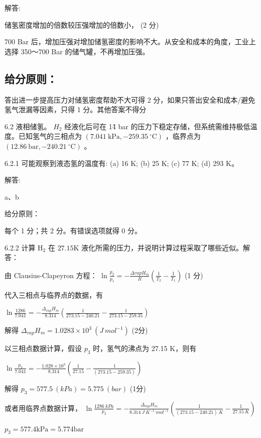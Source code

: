 解答:

储氢密度增加的倍数较压强增加的倍数小， (2 分)

700 Bar 后，增加压强对增加储氢密度的影响不大。从安全和成本的角度，工业上选择 350～700 Bar 的储气罐，不再增加压强。

\subsection*{给分原则：}

答出进一步提高压力对储氢密度帮助不大可得 2 分，如果只答出安全和成本/避免氢气泄漏等因素，只得 1 分。其他答案不得分

6.2 液相储氢。 $H_{2}$ 经液化后可在 1\~4 bar 的压力下稳定存储，但系统需维持极低温度。已知氢气的三相点为 $(7.041\ \text{kPa}, -259.35\ ^{\circ}\text{C})$ ，临界点为 $(12.86\ \text{bar}, -240.21\ ^{\circ}\text{C})$ 。

6.2.1 可能观察到液态氢的温度有: (a) 16 K; (b) 25 K; (c) 77 K; (d) 293 K。

解答:

a、b

给分原则：

每个 1 分；共 2 分。有错误选项就得 0 分。

6.2.2 计算 $\mathrm{H}_{2}$ 在 $27.15\mathrm{K}$ 液化所需的压力，并说明计算过程采取了哪些近似。解答：

由 Clausius-Clapeyron 方程： $\ln\frac{p_{2}}{p_{1}}=-\frac{\Delta vapH_{m}}{R}\left(\frac{1}{T_{2}}-\frac{1}{T_{1}}\right)$ (1 分)

代入三相点与临界点的数据，有

$
\ln {\frac {1 2 8 6}{7 . 0 4 1}} = - \frac {\Delta_ {v a p} H _ {m}}{8 . 3 1 4} \left(\frac {1}{2 7 3 . 1 5 - 2 4 0 . 2 1} - \frac {1}{2 7 3 . 1 5 - 2 5 9 . 3 5}\right)
$

解得 $\Delta_{vap}H_{m}=1.0283\times10^{3}\ (J\ mol^{-1})$ (2分)

以三相点数据计算，假设 $p_{3}$ 时，氢气的沸点为 27.15 K，则有

$
\ln \frac {p _ {3}}{7 . 0 4 1} = - \frac {1 . 0 2 8 \times 1 0 ^ {3}}{8 . 3 1 4} \left(\frac {1}{2 7 . 1 5} - \frac {1}{(2 7 3 . 1 5 - 2 5 9 . 3 5)}\right)
$

解得 $p_{3}=577.5\ (kPa)=5.775\ (bar)$ (1分)

或者用临界点数据计算， $\ln\frac{1286\ kPa}{p_{3}}=-\frac{\Delta_{vap}H_{m}}{8.314\ J\ K^{-1}\ mol^{-1}}\left(\frac{1}{(273.15-240.21)\ K}-\frac{1}{27.15\ K}\right)$

$
p _ {3} = 5 7 7. 4 \mathrm{kPa} = 5. 7 7 4 \mathrm{bar}
$

